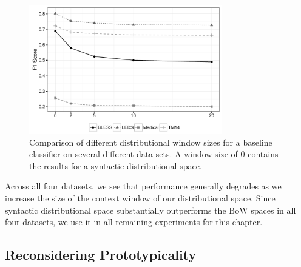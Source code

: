 \begin{figure}
  \centering
  \includegraphics[width=0.75\textwidth]{plots/window.pdf}
  \caption{Comparison of different distributional window sizes for a baseline
  classifier on several different data sets. A window size of 0 contains the
  results for a syntactic distributional space.}
  \label{fig:window}
\end{figure}

Across all four datasets, we see that performance generally degrades as we
increase the size of the context window of our distributional space. Since
syntactic distributional space substantially outperforms the BoW spaces
in all four datasets, we use it in all remaining experiments for this chapter.



\subsection{Reconsidering Prototypicality}

